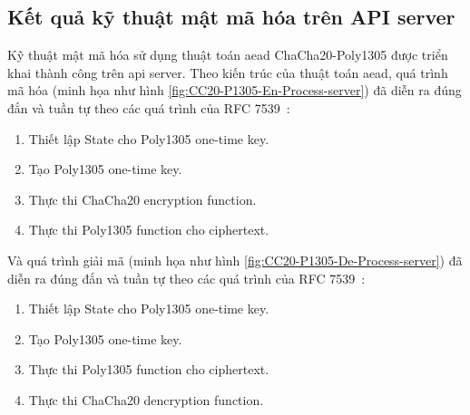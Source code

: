 \subsection{Kết quả kỹ thuật mật mã hóa trên API server}

Kỹ thuật mật mã hóa sử dụng thuật toán \acrshort{aead} ChaCha20-Poly1305 được triển khai thành công trên \acrshort{api} server. Theo kiến trúc của thuật toán \acrshort{aead}, quá trình mã hóa (minh họa như hình \ref{fig:CC20-P1305-En-Process-server}) đã diễn ra đúng đắn và tuần tự theo các quá trình của RFC 7539~\cite{rfc7539}:

\begin{enumerate}
    \item Thiết lập State cho Poly1305 one-time key.
    \item Tạo Poly1305 one-time key.
    \item Thực thi ChaCha20 encryption function.
    \item Thực thi Poly1305 function cho ciphertext.
\end{enumerate}

Và quá trình giải mã (minh họa như hình \ref{fig:CC20-P1305-De-Process-server}) đã diễn ra đúng đắn và tuần tự theo các quá trình của RFC 7539~\cite{rfc7539}:

\begin{enumerate}
    \item Thiết lập State cho Poly1305 one-time key.
    \item Tạo Poly1305 one-time key.
    \item Thực thi Poly1305 function cho ciphertext.
    \item Thực thi ChaCha20 dencryption function.
\end{enumerate}

